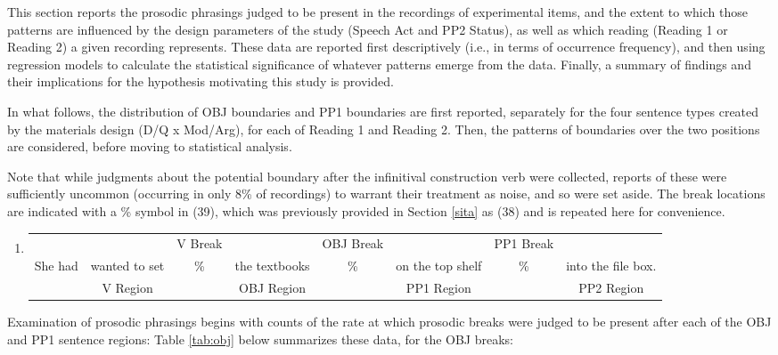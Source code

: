 \documentclass[11pt,oneside]{book}
\providecommand{\tightlist}{%
  \setlength{\itemsep}{0pt}\setlength{\parskip}{0pt}}
\begin{document}
This section reports the prosodic phrasings judged to be present in the recordings of experimental items, and the extent to which those patterns are influenced by the design parameters of the study (Speech Act and PP2 Status), as well as which reading (Reading 1 or Reading 2) a given recording represents. These data are reported first descriptively (i.e., in terms of occurrence frequency), and then using regression models to calculate the statistical significance of whatever patterns emerge from the data. Finally, a summary of findings and their implications for the hypothesis motivating this study is provided.

In what follows, the distribution of OBJ boundaries and PP1 boundaries are first reported, separately for the four sentence types created by the materials design (D/Q x Mod/Arg), for each of Reading 1 and Reading 2. Then, the patterns of boundaries over the two positions are considered, before moving to statistical analysis.

Note that while judgments about the potential boundary after the infinitival construction verb were collected, reports of these were sufficiently uncommon (occurring in only 8\% of recordings) to warrant their treatment as noise, and so were set aside. The break locations are indicated with a \% symbol in (39), which was previously provided in Section \ref{sita} as (38) and is repeated here for convenience.

\begin{enumerate}
\def\labelenumi{(\arabic{enumi})}
\setcounter{enumi}{38}
\tightlist
\item
  \begingroup
  \setlength{\tabcolsep}{1pt}

  \begin{tabular}{cccccccc}
    & & \footnotesize V Break & & \footnotesize OBJ Break & & \footnotesize PP1 Break & \\
    She had & wanted to set & \% & the textbooks & \% & on the top shelf & \% & into the file box. \\
    \cmidrule(r){2-2} \cmidrule(r){4-4} \cmidrule(r){6-6} \cmidrule(r){8-8} 
    & \footnotesize V Region & & \footnotesize OBJ Region & & \footnotesize PP1 Region & & PP2 Region \\
  \end{tabular}
    \endgroup
\end{enumerate}

Examination of prosodic phrasings begins with counts of the rate at which prosodic breaks were judged to be present after each of the OBJ and PP1 sentence regions: Table \ref{tab:obj} below summarizes these data, for the OBJ breaks:
\end{document}
